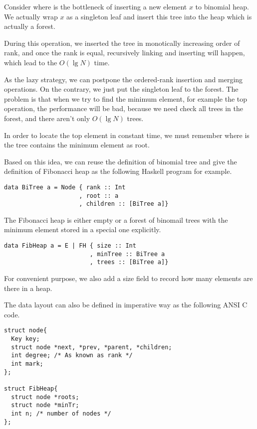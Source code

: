 \documentclass{article}
\begin{document}
Consider where is the bottleneck of inserting a new element $x$ to 
binomial heap. We actually wrap $x$ as a singleton leaf and insert 
this tree into the heap which is actually a forest. 

During this operation, we inserted the tree in 
monotically increasing order of rank, and once the rank is equal,
recursively linking and inserting will happen, which lead to the
$O(\lg N)$ time.

As the lazy strategy, we can postpone the ordered-rank insertion and
merging operations. On the contrary, we just put the singleton
leaf to the forest. The problem is that when we try to find the
minimum element, for example the top operation, the performance
will be bad, because we need check all trees in the forest, and 
there aren't only $O(\lg N)$ trees.

In order to locate the top element in constant time, we must remember
where is the tree contains the minimum element as root.

Based on this idea, we can reuse the definition of binomial tree
and give the definition of Fibonacci heap as the following Haskell
program for example.

\lstset{language=Haskell}
\begin{lstlisting}
data BiTree a = Node { rank :: Int
                     , root :: a
                     , children :: [BiTree a]}
\end{lstlisting}

The Fibonacci heap is either empty or a forest of binomail trees with
the minimum element stored in a special one explicitly.

\begin{lstlisting}
data FibHeap a = E | FH { size :: Int
                        , minTree :: BiTree a
                        , trees :: [BiTree a]}
\end{lstlisting}

For convenient purpose, we also add a size field to record how many
elements are there in a heap.

The data layout can also be defined in imperative way as the following
ANSI C code.

\lstset{language=C}
\begin{lstlisting}
struct node{
  Key key;
  struct node *next, *prev, *parent, *children;
  int degree; /* As known as rank */
  int mark;
};

struct FibHeap{
  struct node *roots;
  struct node *minTr; 
  int n; /* number of nodes */
};
\end{lstlisting}
\end{document}
